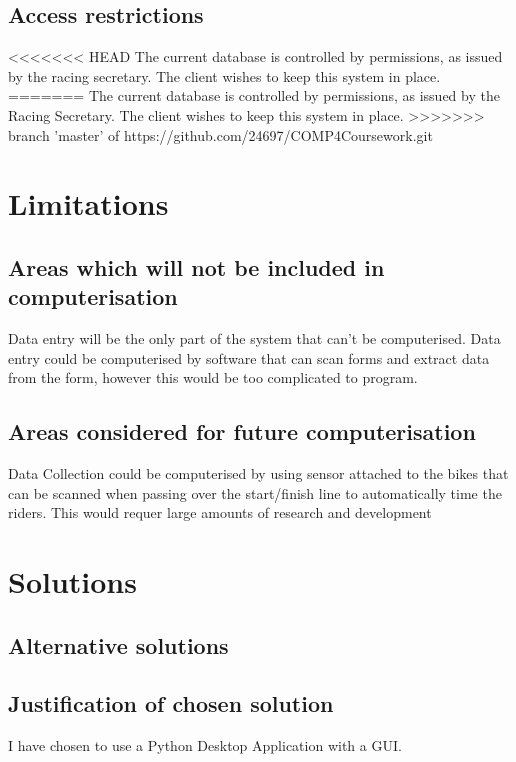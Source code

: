 \subsection{Access restrictions}
<<<<<<< HEAD
The current database is controlled by permissions, as issued by the racing secretary. The client wishes to keep this system in place.
=======
The current database is controlled by permissions, as issued by the Racing Secretary. The client wishes to keep this system in place.
>>>>>>> branch 'master' of https://github.com/24697/COMP4Coursework.git
\section{Limitations}

\subsection{Areas which will not be included in computerisation}
Data entry will be the only part of the system that can't be computerised. Data entry could be computerised by software that can scan forms and extract data from the form, however this would be too complicated to program.
\subsection{Areas considered for future computerisation}
Data Collection could be computerised by using sensor attached to the bikes that can be scanned when passing over the start/finish line to automatically time the riders. This would requer large amounts of research and development
\section{Solutions}

\subsection{Alternative solutions}

\subsection{Justification of chosen solution}
I have chosen to use a Python Desktop Application with a GUI.
